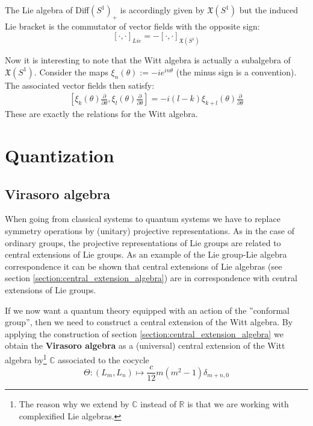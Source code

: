 	The Lie algebra of Diff$(S^1)_+$ is accordingly given by $\mathfrak{X}(S^1)$ but the induced Lie bracket is the commutator of vector fields with the opposite sign: \[[\cdot, \cdot]_{Lie} = -[\cdot, \cdot]_{\mathfrak{X}(S^1)}\]
	
	Now it is interesting to note that the Witt algebra is actually a subalgebra of $\mathfrak{X}(S^1)$. Consider the maps $\xi_n(\theta):=-ie^{in\theta}$ (the minus sign is a convention). The associated vector fields then satisfy:
	\begin{gather}
		\left[\xi_k(\theta)\frac{\partial}{\partial\theta}, \xi_l(\theta)\frac{\partial}{\partial\theta}\right] = -i(l-k)\xi_{k+l}(\theta)\frac{\partial}{\partial\theta}
	\end{gather}
	These are exactly the relations for the Witt algebra.

\section{Quantization}


\subsection{Virasoro algebra}

	When going from classical systems to quantum systems we have to replace symmetry operations by (unitary) projective representations. As in the case of ordinary groups, the projective representations of Lie groups are related to central extensions of Lie groups. As an example of the Lie group-Lie algebra correspondence it can be shown that central extensions of Lie algebras (see section \ref{section:central_extension_algebra}) are in correspondence with central extensions of Lie groups.
	
	If we now want a quantum theory equipped with an action of the ''conformal group'', then we need to construct a central extension of the Witt algebra. By applying the construction of section \ref{section:central_extension_algebra} we obtain the \textbf{Virasoro algebra} as a (universal) central extension of the Witt algebra by\footnote{The reason why we extend by $\mathbb{C}$ instead of $\mathbb{R}$ is that we are working with complexified Lie algebras.} $\mathbb{C}$ associated to the cocycle \[\Theta:(L_m, L_n)\mapsto \frac{c}{12}m(m^2-1)\delta_{m+n, 0}\]

